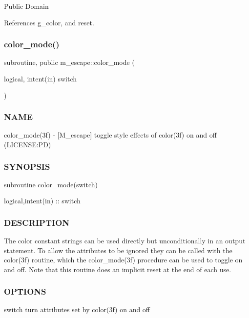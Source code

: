 Public Domain 

References g\+\_\+color, and reset.

\mbox{\label{namespacem__escape_a24566737cb6aa1672180eaa21c8d4f66}} 
\subsubsection{\texorpdfstring{color\+\_\+mode()}{color\_mode()}}
{\footnotesize\ttfamily subroutine, public m\+\_\+escape\+::color\+\_\+mode (\begin{DoxyParamCaption}\item[{logical, intent(in)}]{switch }\end{DoxyParamCaption})}



\subsubsection*{N\+A\+ME}

color\+\_\+mode(3f) -\/ \mbox{[}M\+\_\+escape\mbox{]} toggle style effects of color(3f) on and off (L\+I\+C\+E\+N\+SE\+:PD) \subsubsection*{S\+Y\+N\+O\+P\+S\+IS}

subroutine color\+\_\+mode(switch)

logical,intent(in) \+:\+: switch

\subsubsection*{D\+E\+S\+C\+R\+I\+P\+T\+I\+ON}

The color constant strings can be used directly but unconditionally in an output statement. To allow the attributes to be ignored they can be called with the color(3f) routine, which the color\+\_\+mode(3f) procedure can be used to toggle on and off. Note that this routine does an implicit reset at the end of each use.

\subsubsection*{O\+P\+T\+I\+O\+NS}

switch turn attributes set by color(3f) on and off

